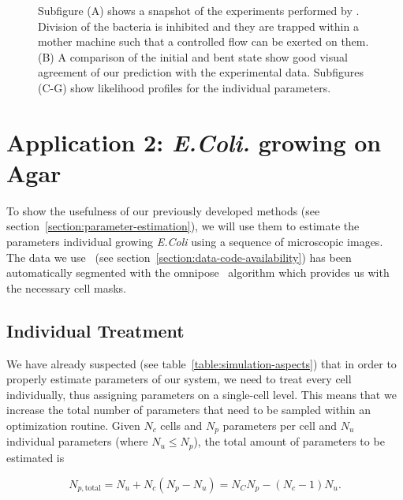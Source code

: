 \documentclass{article}
\begin{document}
\begin{figure}
\begin{minipage}{0.62\textwidth}
\begin{tikzonimage}[width=0.33\textwidth]
        \end{tikzonimage}%
    \end{minipage}
    \caption{
        Subfigure (A) shows a snapshot of the experiments performed by \cite{Amir2014_2}.
        Division of the bacteria is inhibited and they are trapped within a mother machine such that
        a controlled flow can be exerted on them.
        (B) A comparison of the initial and bent state show good visual agreement of our prediction
        with the experimental data.
        Subfigures (C-G) show likelihood profiles for the individual parameters.
    }
    \label{fig:amir-bending-simulation}
\end{figure}


\section{Application 2: \textit{E.Coli.} growing on Agar}
\label{section:application-2}

To show the usefulness of our previously developed methods (see
section~\ref{section:parameter-estimation}), we will use them to estimate the parameters individual
growing \textit{E.Coli} using a sequence of microscopic images.
The data we use~\cite{https://doi.org/10.3203/iwf/k-129} (see
section~\ref{section:data-code-availability}) has been automatically segmented with the
omnipose~\cite{Cutler2022} algorithm which provides us with the necessary cell masks.

\subsection{Individual Treatment}
We have already suspected (see table~\ref{table:simulation-aspects}) that in order to properly
estimate parameters of our system, we need to treat every cell individually, thus assigning
parameters on a single-cell level.
This means that we increase the total number of parameters that need to be sampled within an
optimization routine.
Given $N_c$ cells and $N_p$ parameters per cell and $N_u$ individual parameters (where
$N_u\leq N_p$), the total amount of parameters to be estimated is

\begin{equation}
    N_{p,\text{total}} = N_u + N_c (N_p - N_u) = N_C N_p - (N_c - 1) N_u.
\end{equation}
\end{document}
